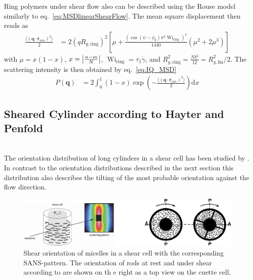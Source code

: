 Ring polymers under shear flow also can be described using the Rouse model \cite{Tsolou2010,Stephanou2019} similarly to eq.\ \ref{eq:MSDlinearShearFlow}. The mean square displacement then reads as
\begin{align}\label{eq:MSDringShearFlow}
\frac{\langle(\mathbf{q}\cdot\mathbf{r}_{nm})^2\rangle}{2} &= 2\left(qR_{g,\mathrm{ring}}\right)^2
\left[ \mu+\frac{\left(\cos(\psi-\phi_0)\pi^2\operatorname{Wi}_\mathrm{ring}\right)^2}{1440} \left(\mu^2+2\mu^3\right) \right]
\end{align}
with $\mu=x(1-x)$, $x=\abs{\frac{n-m}{N}}$, $\operatorname{Wi}_\mathrm{ring}=\tau_1\dot{\gamma}$, and $R_{g,\mathrm{ring}}^2=\frac{Nb^2}{12}=R_{g,\mathrm{lin}}^2/2$. The scattering intensity is then obtained by eq.\ \ref{eq:IQ_MSD}
\begin{align}
 P(\mathbf{q}) & = 2\int_0^1 (1-x) \exp\left(-\frac{\langle(\mathbf{q}\cdot\mathbf{r}_{nm})^2\rangle}{2}\right) \mathrm{d}x
\end{align}
\newpage


\subsection{Sheared Cylinder according to Hayter and Penfold}
\label{sect:ShearedCylinderHayterPenfold}
\hspace{1pt}\\
The orientation distribution of long cylinders in a shear cell has been studied by \cite{Scheraga1951,Jerrard1959,Hayter1984}. In contrast to the orientation distributions described in the next section this distribution also describes the tilting of the most probable orientation against the flow direction.
\begin{figure}[htb]
\begin{center}
\includegraphics[width=\textwidth]{sheared_cylinders_n_phi0.png}
\end{center}
\caption{Shear orientation of micelles in a shear cell with the
corresponding SANS-pattern. The orientation of rods at rest and under shear according to \cite{Scheraga1951} are shown on th e right as a top view on the cuette cell.} \label{sheared_cylinders1}
\end{figure}

